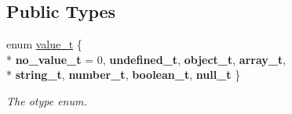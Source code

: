 \subsection*{Public Types}
\begin{DoxyCompactItemize}
\item 
enum \hyperlink{classformat_1_1value_aa0334be06389a7b14af485fa0cd3aa21}{value\+\_\+t} \{ \\*
{\bfseries no\+\_\+value\+\_\+t} = 0, 
{\bfseries undefined\+\_\+t}, 
{\bfseries object\+\_\+t}, 
{\bfseries array\+\_\+t}, 
\\*
{\bfseries string\+\_\+t}, 
{\bfseries number\+\_\+t}, 
{\bfseries boolean\+\_\+t}, 
{\bfseries null\+\_\+t}
 \}\hypertarget{classformat_1_1value_aa0334be06389a7b14af485fa0cd3aa21}{}\label{classformat_1_1value_aa0334be06389a7b14af485fa0cd3aa21}
\begin{DoxyCompactList}\small\item\em The otype enum. \end{DoxyCompactList}
\end{DoxyCompactItemize}
